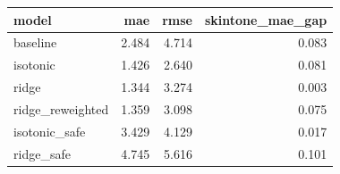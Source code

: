 \begin{tabular}{lrrr}
\toprule
model & mae & rmse & skintone\_mae\_gap \\
\midrule
baseline & 2.484 & 4.714 & 0.083 \\
isotonic & 1.426 & 2.640 & 0.081 \\
ridge & 1.344 & 3.274 & 0.003 \\
ridge\_reweighted & 1.359 & 3.098 & 0.075 \\
isotonic\_safe & 3.429 & 4.129 & 0.017 \\
ridge\_safe & 4.745 & 5.616 & 0.101 \\
\bottomrule
\end{tabular}
